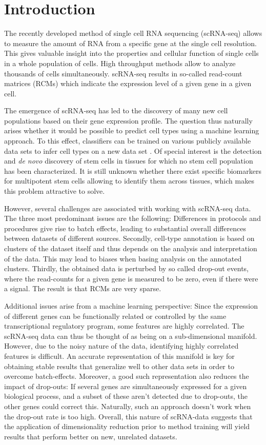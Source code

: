 \documentclass[10pt,conference,compsocconf]{IEEEtran}
\begin{document}
\section*{Introduction} 
The recently developed method of single cell RNA sequencing (scRNA-seq) allows to measure the amount of RNA from a specific gene at the single cell resolution. This gives valuable insight into the properties and cellular function of single cells in a whole population of cells. High throughput methods allow to analyze thousands of cells simultaneously. scRNA-seq results in so-called read-count matrices (RCMs) which indicate the expression level of a given gene in a given cell.
\par 
The emergence of scRNA-seq has led to the discovery of many new cell populations based on their gene expression profile. The question thus naturally arises whether it would be possible to predict cell types using a machine learning approach. To this effect, classifiers can be trained on various publicly available data sets to infer cell types on a new data set \cite{Schwalie2017}. Of special interest is the detection and \textit{de novo} discovery of stem cells in tissues for which no stem cell population has been characterized. It is still unknown whether there exist specific biomarkers for multipotent stem cells allowing to identify them across tissues, which makes this problem attractive to solve. 
\par
However, several challenges are associated with working with scRNA-seq data. The three most predominant issues are the following: Differences in protocols and procedures give rise to batch effects, leading to substantial overall differences between datasets of different sources. Secondly, cell-type annotation is based on clusters of the dataset itself and thus depends on the  analysis and interpretation of the data. This may lead to biases when basing analysis on the annotated clusters. Thirdly, the obtained data is perturbed by so called drop-out events, where the read-counts for a given gene is measured to be zero, even if there were a signal. The result is that RCMs are very sparse. 
\par
Additional issues arise from a machine learning perspective: Since the expression of different genes can be functionally related or controlled by the same transcriptional regulatory program, some features are highly correlated. The scRNA-seq data can thus be thought of as being on a sub-dimensional manifold. However, due to the noisy nature of the data, identifying highly correlated features is difficult. An accurate representation of this manifold is key for obtaining stable results that generalize well to other data sets in order to overcome batch-effects. Moreover, a good such representation also reduces the impact of drop-outs: If several genes are simultaneously expressed for a given biological process, and a subset of these aren't detected due to drop-outs, the other genes could correct this. Naturally, such an approach doesn't work when the drop-out rate is too high. Overall, this nature of scRNA-data suggests that the application of dimensionality reduction prior to method training will yield results that perform better on new, unrelated datasets.
\end{document}

